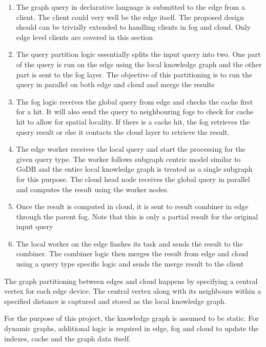 \documentclass[conference]{IEEEtran}
\begin{document}
\begin{enumerate}%
	\item The graph query in declarative language is submitted to the edge from a client. The client could very well be the edge itself. The proposed design should can be trivially extended to handling clients in fog and cloud. Only edge level clients are covered in this section
	\item The query partition logic essentially splits the input query into two. One part of the query is run on the edge using the local knowledge graph and the other part is sent to the fog layer. The objective of this partitioning is to run the query in parallel on both edge and cloud and merge the results
	\item The fog logic receives the global query from edge and checks the cache first for a hit. It will also send the query to neighbouring fogs to check for cache hit to allow for spatial locality. If there is a cache hit, the fog retrieves the query result or else it contacts the cloud layer to retrieve the result. 
	\item The edge worker receives the local query and start the processing for the given query type. The worker follows subgraph centric model similar to GoDB and the entire local knowledge graph is treated as a single subgraph for this purpose. The cloud head node receives the global query in parallel and computes the result using the worker nodes. 
	\item Once the result is computed in cloud, it is sent to result combiner in edge through the parent fog. Note that this is only a partial result for the original input query
	\item The local worker on the edge finshes its task and sends the result to the combiner. The combiner logic then merges the result from edge and cloud using a query type specific logic and sends the merge result to the client 
\end{enumerate}

The graph partitioning between edges and cloud happens by specifying a central vertex for each edge device. The central vertex along with its neighbours within a specified distance is captured and stored as the local knowledge graph.

For the purpose of this project, the knowledge graph is assumed to be static. For dynamic graphs, additional logic is required in edge, fog and cloud to update the indexes, cache and the graph data itself.
\end{document}
